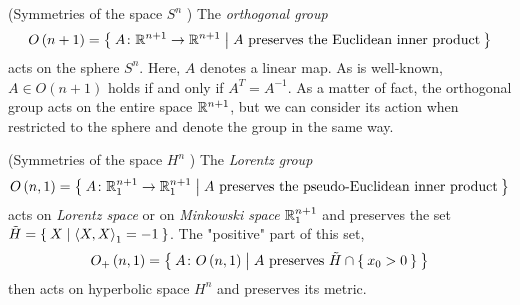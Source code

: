 \documentclass[../main.tex]{subfiles}
\begin{document}
\begin{definition}(Symmetries of the space \(S^n\) {\autocite[][Chapter~7A]{kuhnelwolfgang_2006}})\label{Group:Sphere}
The \textit{orthogonal group}
\[
O\left(n+1\right)
=
\Set{A\colon\mathbb{R}^{n+1}\to\mathbb{R}^{n+1}|\text{\(A\) preserves the Euclidean inner product}}
\]
acts on the sphere \(S^n\).
Here, \(A\) denotes a linear map.
As is well-known, \(A\in O\left(n+1\right)\) holds if and only if \(A^T=A^{-1}\).
As a matter of fact, the orthogonal group acts on the entire space \(\mathbb{R}^{n+1}\),
but we can consider its action when restricted to the sphere and denote the group in the same way.
\end{definition}
\begin{definition}(Symmetries of the space \(H^n\) {\autocite[][Chapter~7A]{kuhnelwolfgang_2006}})\label{Group:Hyperbolic}
The \textit{Lorentz group}
\[
O\left(n,1\right)
=
\Set{A\colon\mathbb{R}^{n+1}_1\to\mathbb{R}^{n+1}_1|\text{\(A\) preserves the pseudo-Euclidean inner product}}
\]
acts on \textit{Lorentz space} or on \textit{Minkowski space} \(\mathbb{R}^{n+1}_1\)
and preserves the set \(\tilde{H}=\Set{X|\left\langle{X},{X}\right\rangle_1=-1}\).
The "positive" part of this set,
\[
O_{+}\left(n,1\right)
=
\Set{A\colon O\left(n,1\right)|\text{\(A\) preserves \(\tilde{H}\cap\Set{x_0>0}\)}}
\]
then acts on hyperbolic space \(H^n\) and preserves its metric.
\end{definition}
\end{document}
